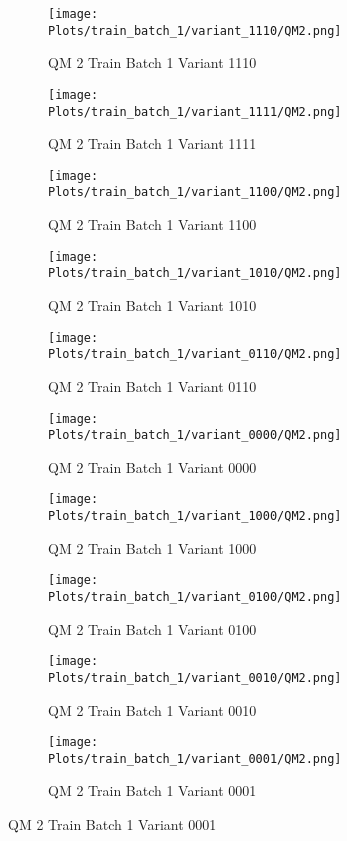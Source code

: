 \documentclass{DissertateFigs}
\begin{document}
\begin{figure}[t!]
    \begin{subfigure}{0.47\textwidth}
    \texttt{[image: Plots/train\_batch\_1/variant\_1110/QM2.png]}
    \caption{QM 2 Train Batch 1 Variant 1110}
    \end{subfigure}
    \begin{subfigure}{0.47\textwidth}
    \texttt{[image: Plots/train\_batch\_1/variant\_1111/QM2.png]}
    \caption{QM 2 Train Batch 1 Variant 1111}
    \end{subfigure}

\medskip

    \begin{subfigure}{0.47\textwidth}
    \texttt{[image: Plots/train\_batch\_1/variant\_1100/QM2.png]}
    \caption{QM 2 Train Batch 1 Variant 1100}
    \end{subfigure}
    \begin{subfigure}{0.47\textwidth}
    \texttt{[image: Plots/train\_batch\_1/variant\_1010/QM2.png]}
    \caption{QM 2 Train Batch 1 Variant 1010}
    \end{subfigure}

\medskip

    \begin{subfigure}{0.47\textwidth}
    \texttt{[image: Plots/train\_batch\_1/variant\_0110/QM2.png]}
    \caption{QM 2 Train Batch 1 Variant 0110}
    \end{subfigure}
    \begin{subfigure}{0.47\textwidth}
    \texttt{[image: Plots/train\_batch\_1/variant\_0000/QM2.png]}
    \caption{QM 2 Train Batch 1 Variant 0000}
    \end{subfigure}

\medskip

    \begin{subfigure}{0.47\textwidth}
    \texttt{[image: Plots/train\_batch\_1/variant\_1000/QM2.png]}
    \caption{QM 2 Train Batch 1 Variant 1000}
    \end{subfigure}
    \begin{subfigure}{0.47\textwidth}
    \texttt{[image: Plots/train\_batch\_1/variant\_0100/QM2.png]}
    \caption{QM 2 Train Batch 1 Variant 0100}
    \end{subfigure}

\medskip

    \begin{subfigure}{0.47\textwidth}
    \texttt{[image: Plots/train\_batch\_1/variant\_0010/QM2.png]}
    \caption{QM 2 Train Batch 1 Variant 0010}
    \end{subfigure}
    \begin{subfigure}{0.47\textwidth}
    \texttt{[image: Plots/train\_batch\_1/variant\_0001/QM2.png]}
    \caption{QM 2 Train Batch 1 Variant 0001}
    \end{subfigure}


\end{figure}
\end{document}
